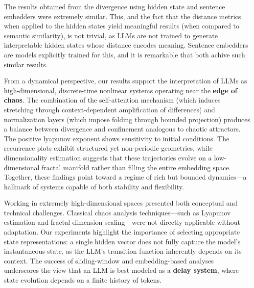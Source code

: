 \documentclass[a4paper,12pt]{article}
\begin{document}
The results obtained from the divergence using hidden state and sentence embedders were extremely similar. This, and the fact that the distance metrics when applied to the hidden states yield meaningful results (when compared to semantic similarity), is not trivial, as LLMs are not trained to generate interpretable hidden states whose distance encodes meaning. Sentence embedders are models explicitly trained for this, and it is remarkable that both achive such similar results.

From a dynamical perspective, our results support the interpretation of LLMs as high-dimensional, discrete-time nonlinear systems operating near the \textbf{edge of chaos}. The combination of the self-attention mechanism (which induces stretching through context-dependent amplification of differences) and normalization layers (which impose folding through bounded projection) produces a balance between divergence and confinement analogous to chaotic attractors. The positive lyapunov exponent shows sensitivity to initial conditions. The recurrence plots exhibit structured yet non-periodic geometries, while dimensionality estimation suggests that these trajectories evolve on a low-dimensional fractal manifold rather than filling the entire embedding space. Together, these findings point toward a regime of rich but bounded dynamics—a hallmark of systems capable of both stability and flexibility.


Working in extremely high-dimensional spaces presented both conceptual and technical challenges. Classical chaos analysis techniques—such as Lyapunov estimation and fractal-dimension scaling—were not directly applicable without adaptation. Our experiments highlight the importance of selecting appropriate state representations: a single hidden vector does not fully capture the model's instantaneous state, as the LLM's transition function inherently depends on its context. The success of sliding-window and embedding-based analyses underscores the view that an LLM is best modeled as a \textbf{delay system}, where state evolution depends on a finite history of tokens. 
\end{document}
